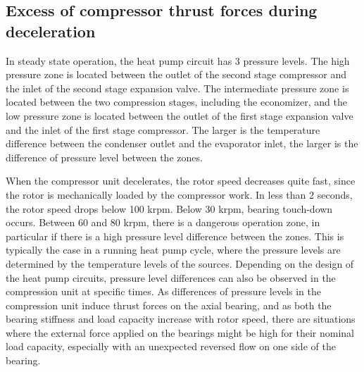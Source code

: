 \subsection{Excess of compressor thrust forces during
  deceleration}
\label{sec:awp-P-balance}

In steady state operation, the heat pump circuit has 3 pressure
levels. The high pressure zone is located between the outlet of
the second stage compressor and the inlet of the second stage
expansion valve. The intermediate pressure zone is located between the
two compression stages, including the economizer, and the low pressure
zone is located between the outlet of the first stage expansion valve
and the inlet of the first stage compressor. The larger is the
temperature difference between the condenser outlet and the evaporator
inlet, the larger is the difference of pressure level between the
zones.

When the compressor unit decelerates, the rotor speed decreases quite
fast, since the rotor is mechanically loaded by the compressor
work. In less than 2 seconds, the rotor speed drops below 100
krpm. Below 30 krpm, bearing touch-down occurs. Between 60 and 80
krpm, there is a dangerous operation zone, in particular if there is a
high pressure level difference between the zones. This is typically
the case in a running heat pump cycle, where the pressure levels are
determined by the temperature levels of the sources. Depending on the
design of the heat pump circuits, pressure level differences can also
be observed in the compression unit at specific times. As differences
of pressure levels in the compression unit induce thrust forces on the
axial bearing, and as both the bearing stiffness and load capacity
increase with rotor speed, there are situations where the external
force applied on the bearings might be high for their nominal load
capacity, especially with an unexpected reversed flow on one side of
the bearing.

